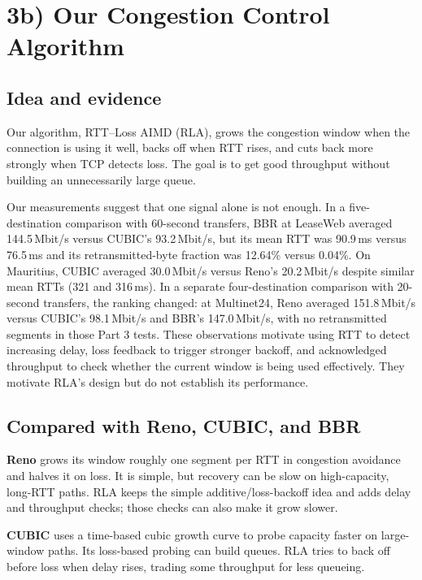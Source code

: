 \documentclass[11pt]{article}
\begin{document}
\section*{3b) Our Congestion Control Algorithm}

\subsection*{Idea and evidence}

Our algorithm, RTT--Loss AIMD (RLA), grows the congestion window when the
connection is using it well, backs off when RTT rises, and cuts back more
strongly when TCP detects loss. The goal is to get good throughput without
building an unnecessarily large queue.

Our measurements suggest that one signal alone is not enough. In a
five-destination comparison with 60-second transfers, BBR at LeaseWeb averaged
144.5\,Mbit/s versus CUBIC's 93.2\,Mbit/s, but its mean RTT was
90.9\,ms versus 76.5\,ms and its retransmitted-byte fraction was 12.64\%
versus 0.04\%. On Mauritius, CUBIC averaged 30.0\,Mbit/s versus Reno's
20.2\,Mbit/s despite similar mean RTTs (321 and 316\,ms).
In a separate four-destination comparison with 20-second transfers, the
ranking changed: at Multinet24,
Reno averaged 151.8\,Mbit/s versus CUBIC's 98.1\,Mbit/s and BBR's
147.0\,Mbit/s, with no retransmitted segments in those Part 3 tests.
These observations motivate using RTT to detect increasing delay, loss
feedback to trigger stronger backoff, and acknowledged throughput to check
whether the current window is being used effectively. They motivate RLA's
design but do not establish its performance.

\subsection*{Compared with Reno, CUBIC, and BBR}

\textbf{Reno} grows its window roughly one segment per RTT in congestion
avoidance and halves it on loss. It is simple, but recovery can be slow on
high-capacity, long-RTT paths. RLA keeps the simple additive/loss-backoff idea
and adds delay and throughput checks; those checks can also make it grow slower.

\textbf{CUBIC} uses a time-based cubic growth curve to probe capacity faster
on large-window paths. Its loss-based probing can build queues. RLA tries to
back off before loss when delay rises, trading some throughput for less queueing.
\end{document}
